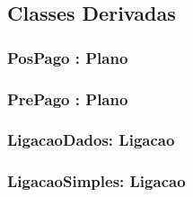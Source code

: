 \subsection{Classes Derivadas}

\subsubsection{PosPago : Plano}

\subsubsection{PrePago : Plano}

\subsubsection{LigacaoDados: Ligacao}

\subsubsection{LigacaoSimples: Ligacao}


